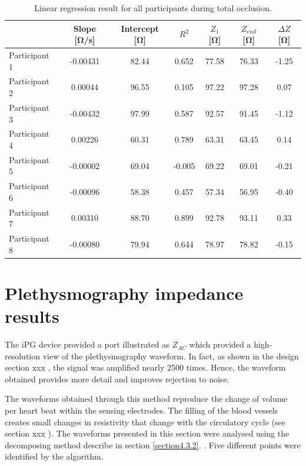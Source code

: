 \begin{table}[htbp]
	\caption{Linear regression result for all participants during total occlusion.}
	\label{tbl:total_occlusion:region6}
	\centering
	\begin{tabu}{lcccccc}
		\toprule
		& \textbf{Slope [\si{\ohm/\second}]} & \textbf{Intercept [\si{\ohm}]} & \textbf{$R^2$} & \textbf{$Z_1$ [\si{\ohm}]} & \textbf{$Z_{end}$ [\si{\ohm}]} & \textbf{ $\Delta Z$ [\si{\ohm}]} \\ \midrule
	   	Participant 1  &  -0.00431  &  82.44   &      0.652 &   77.58 &  76.33  &   -1.25\\ 
		Participant 2  &   0.00044  &  96.55   &      0.105 &   97.22 &   97.28 &    0.07\\
		Participant 3  &  -0.00432  &  97.99   &      0.587 &   92.57 &   91.45 &   -1.12\\
		Participant 4  &   0.00226  &  60.31   &      0.789 &   63.31 &   63.45 &    0.14\\
		Participant 5  &  -0.00002  &  69.04   &     -0.005 &   69.22 &   69.01 &   -0.21\\
		Participant 6  &  -0.00096  &  58.38   &      0.457 &   57.34 &   56.95 &   -0.40\\
		Participant 7  &   0.00310  &  88.70   &      0.899 &   92.78 &   93.11 &    0.33\\
		Participant 8  &  -0.00080  &  79.94   &      0.644 &   78.97 &   78.82 &   -0.15\\ \bottomrule
	\end{tabu} 
\end{table}


\pagebreak
\section{Plethysmography impedance results}
\label{section5.3}
The iPG device provided a port illustrated as $Z_{AC}$  which provided a high-resolution view of the plethysmography waveform.  In fact, as shown in the design section xxx , the signal was amplified nearly 2500 times. Hence, the waveform obtained provides more detail and improves rejection to noise.

The waveforms obtained through this method reproduce the change of volume per heart beat within the sensing electrodes. The filling of the blood vessels creates small changes in resistivity that change with the circulatory cycle (see section xxx ). The waveforms presented in this section were analysed using the decomposing method describe in section \ref{section4.3.2}. . Five different points were identified by the algorithm.

